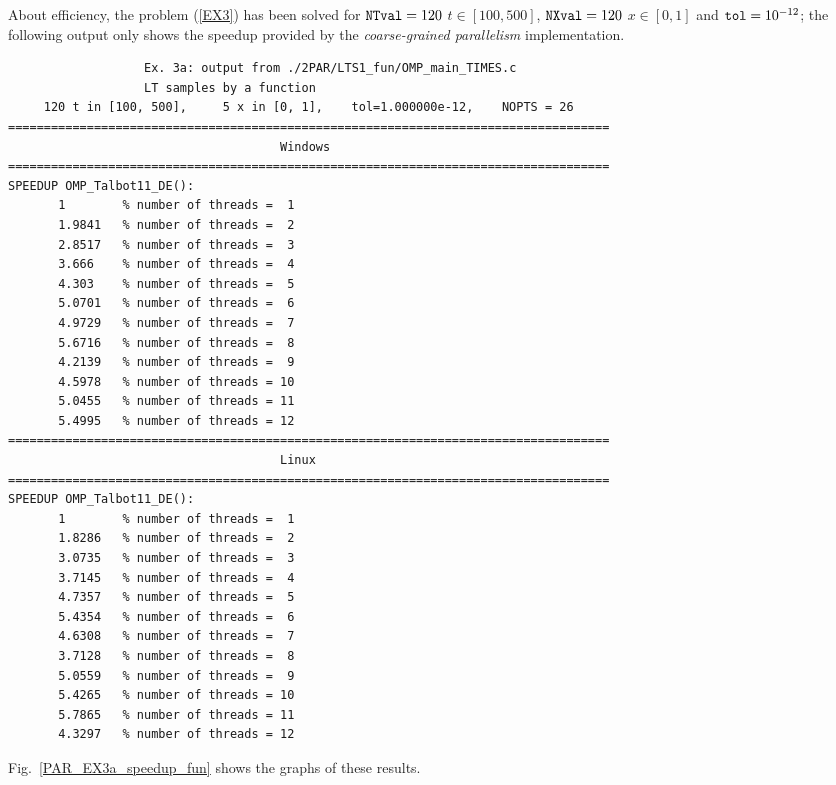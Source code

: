 \documentclass[a4paper,10pt]{report}%
\begin{document}
About efficiency, the problem (\ref{EX3}) has been solved for ${\tt NTval}=120$ $t\in[100,500]$, ${\tt NXval}=120$
$x\in[0,1]$ and ${\tt tol}=10^{-12}$; the following output only shows the speedup provided by the 
{\em coarse-grained parallelism} implementation.
\begin{lstlisting}
                   Ex. 3a: output from ./2PAR/LTS1_fun/OMP_main_TIMES.c
                   LT samples by a function
     120 t in [100, 500],     5 x in [0, 1],    tol=1.000000e-12,    NOPTS = 26
====================================================================================
                                      Windows
====================================================================================
SPEEDUP OMP_Talbot11_DE():
       1        % number of threads =  1
       1.9841   % number of threads =  2
       2.8517   % number of threads =  3
       3.666    % number of threads =  4
       4.303    % number of threads =  5
       5.0701   % number of threads =  6
       4.9729   % number of threads =  7
       5.6716   % number of threads =  8
       4.2139   % number of threads =  9
       4.5978   % number of threads = 10
       5.0455   % number of threads = 11
       5.4995   % number of threads = 12
====================================================================================
                                      Linux
====================================================================================
SPEEDUP OMP_Talbot11_DE():
       1        % number of threads =  1
       1.8286   % number of threads =  2
       3.0735   % number of threads =  3
       3.7145   % number of threads =  4
       4.7357   % number of threads =  5
       5.4354   % number of threads =  6
       4.6308   % number of threads =  7
       3.7128   % number of threads =  8
       5.0559   % number of threads =  9
       5.4265   % number of threads = 10
       5.7865   % number of threads = 11
       4.3297   % number of threads = 12
\end{lstlisting}
Fig.~\ref{PAR_EX3a_speedup_fun} shows the graphs of these results.
\end{document}
